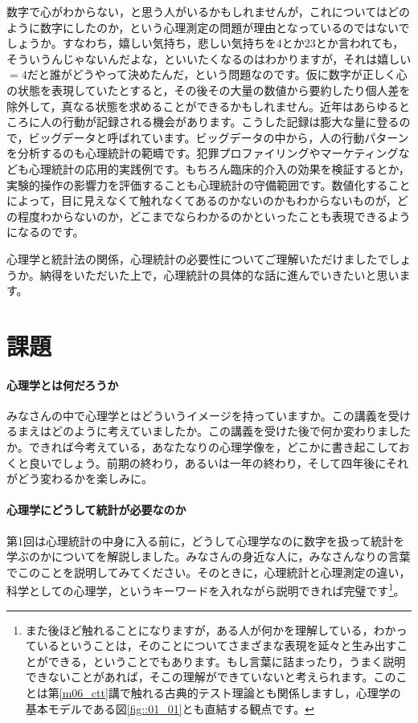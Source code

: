 \documentclass{ltjsbook}
\begin{document}
数字で心がわからない，と思う人がいるかもしれませんが，これについてはどのように数字にしたのか，という心理測定の問題が理由となっているのではないでしょうか。すなわち，嬉しい気持ち，悲しい気持ちを4とか23とか言われても，そういうんじゃないんだよな，といいたくなるのはわかりますが，それは嬉しい$=4$だと誰がどうやって決めたんだ，という問題なのです。仮に数字が正しく心の状態を表現していたとすると，その後その大量の数値から要約したり個人差を除外して，真なる状態を求めることができるかもしれません。近年はあらゆるところに人の行動が記録される機会があります。こうした記録は膨大な量に登るので，ビッグデータと呼ばれています。ビッグデータの中から，人の行動パターンを分析するのも心理統計の範疇です。犯罪プロファイリングやマーケティングなども心理統計の応用的実践例です。もちろん臨床的介入の効果を検証するとか，実験的操作の影響力を評価することも心理統計の守備範囲です。数値化することによって，目に見えなくて触れなくてあるのかないのかもわからないものが，どの程度わからないのか，どこまでならわかるのかといったことも表現できるようになるのです。

心理学と統計法の関係，心理統計の必要性についてご理解いただけましたでしょうか。納得をいただいた上で，心理統計の具体的な話に進んでいきたいと思います。
\section{課題}
\paragraph{心理学とは何だろうか}
みなさんの中で心理学とはどういうイメージを持っていますか。この講義を受けるまえはどのように考えていましたか。この講義を受けた後で何か変わりましたか。できれば今考えている，あなたなりの心理学像を，どこかに書き起こしておくと良いでしょう。前期の終わり，あるいは一年の終わり，そして四年後にそれがどう変わるかを楽しみに。
\paragraph{心理学にどうして統計が必要なのか}
第1回は心理統計の中身に入る前に，どうして心理学なのに数字を扱って統計を学ぶのかについてを解説しました。みなさんの身近な人に，みなさんなりの言葉でこのことを説明してみてください。そのときに，心理統計と心理測定の違い，科学としての心理学，というキーワードを入れながら説明できれば完璧です\footnote{また後ほど触れることになりますが，ある人が何かを理解している，わかっているということは，そのことについてさまざまな表現を延々と生み出すことができる，ということでもあります。もし言葉に詰まったり，うまく説明できないことがあれば，そこの理解ができていないと考えられます。このことは第\ref{m06_ctt}講で触れる古典的テスト理論とも関係しますし，心理学の基本モデルである図\ref{fig::01_01}とも直結する観点です。}。
\end{document}
